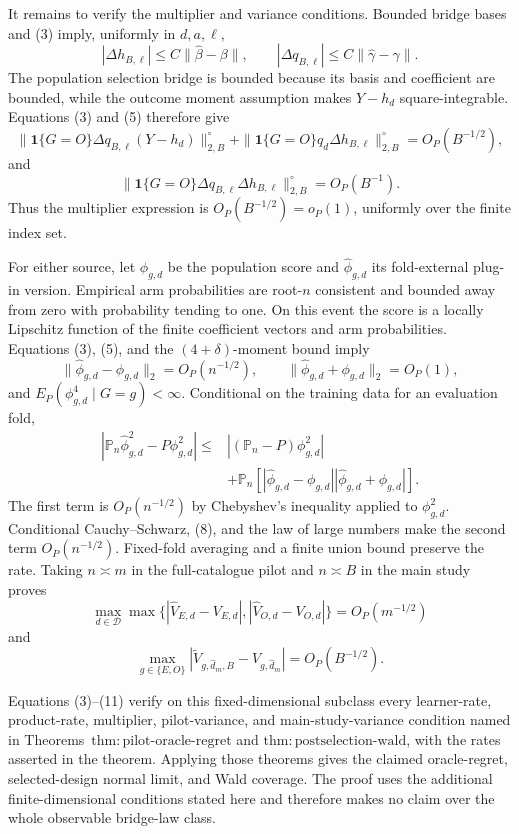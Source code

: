 It remains to verify the multiplier and variance conditions.  Bounded bridge bases and (3) imply, uniformly in \(d,a,\ell\),
\[
 |\Delta h_{B,\ell}|\le C\|\widehat\beta-\beta\|,
 \qquad
 |\Delta q_{B,\ell}|\le C\|\widehat\gamma-\gamma\|.       \tag{5}
\]
The population selection bridge is bounded because its basis and coefficient are bounded, while the outcome moment assumption makes \(Y-h_d\) square-integrable.  Equations (3) and (5) therefore give
\[
 \|\mathbf1\{G=O\}\Delta q_{B,\ell}(Y-h_d)\|_{2,B}^{\circ}
 +\|\mathbf1\{G=O\}q_d\Delta h_{B,\ell}\|_{2,B}^{\circ}
 =O_P(B^{-1/2}),                                               \tag{6}
\]
and
\[
 \|\mathbf1\{G=O\}\Delta q_{B,\ell}\Delta h_{B,\ell}\|_{2,B}^{\circ}
 =O_P(B^{-1}).                                                 \tag{7}
\]
Thus the multiplier expression is \(O_P(B^{-1/2})=o_P(1)\), uniformly over the finite index set.

For either source, let \(\phi_{g,d}\) be the population score and \(\widehat\phi_{g,d}\) its fold-external plug-in version.  Empirical arm probabilities are root-\(n\) consistent and bounded away from zero with probability tending to one.  On this event the score is a locally Lipschitz function of the finite coefficient vectors and arm probabilities.  Equations (3), (5), and the \((4+\delta)\)-moment bound imply
\[
 \|\widehat\phi_{g,d}-\phi_{g,d}\|_2=O_P(n^{-1/2}),
 \qquad
 \|\widehat\phi_{g,d}+\phi_{g,d}\|_2=O_P(1),               \tag{8}
\]
and \(E_P(\phi_{g,d}^4\mid G=g)<\infty\).  Conditional on the training data for an evaluation fold,
\[
\begin{aligned}
 |\mathbb P_n\widehat\phi_{g,d}^2-P\phi_{g,d}^2|
 \le{}&| (\mathbb P_n-P)\phi_{g,d}^2|\\
 &+\mathbb P_n\left[
 |\widehat\phi_{g,d}-\phi_{g,d}|
 |\widehat\phi_{g,d}+\phi_{g,d}|
 \right].
\end{aligned}                                                   \tag{9}
\]
The first term is \(O_P(n^{-1/2})\) by Chebyshev's inequality applied to \(\phi_{g,d}^2\).  Conditional Cauchy--Schwarz, (8), and the law of large numbers make the second term \(O_P(n^{-1/2})\).  Fixed-fold averaging and a finite union bound preserve the rate.  Taking \(n\asymp m\) in the full-catalogue pilot and \(n\asymp B\) in the main study proves
\[
 \max_{d\in\mathcal D}\max\bigl\{
 |\widehat V_{E,d}-V_{E,d}|,
 |\widehat V_{O,d}-V_{O,d}|\bigr\}=O_P(m^{-1/2})             \tag{10}
\]
and
\[
 \max_{g\in\{E,O\}}
 |\widetilde V_{g,\widehat d_m,B}-V_{g,\widehat d_m}|
 =O_P(B^{-1/2}).                                               \tag{11}
\]

Equations (3)--(11) verify on this fixed-dimensional subclass every learner-rate, product-rate, multiplier, pilot-variance, and main-study-variance condition named in Theorems~\(\mathrm{thm{:}pilot\text{-}oracle\text{-}regret}\) and \(\mathrm{thm{:}postselection\text{-}wald}\), with the rates asserted in the theorem.  Applying those theorems gives the claimed oracle-regret, selected-design normal limit, and Wald coverage.  The proof uses the additional finite-dimensional conditions stated here and therefore makes no claim over the whole observable bridge-law class.